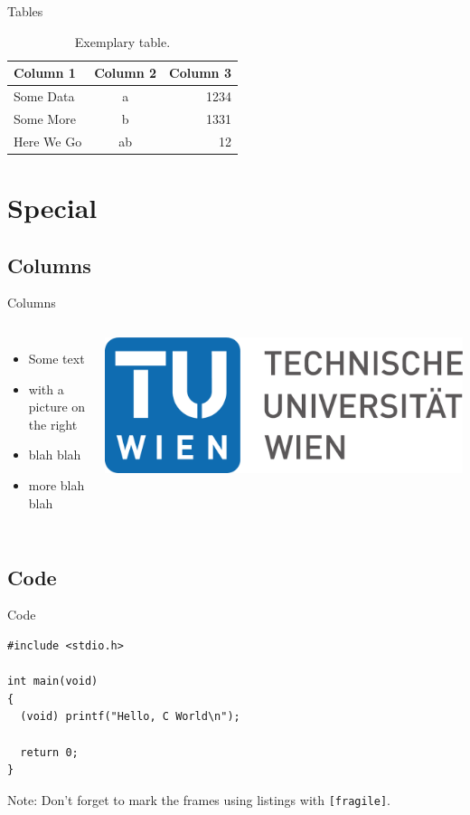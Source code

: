 \documentclass{beamer}
\begin{document}
\begin{frame}{Tables}{}
  \begin{table}
    \centering
    \begin{tabular}{lcr}
      \toprule
      Column 1 & Column 2 & Column 3 \\
      \midrule
      Some Data & a & 1234 \\
      Some More & b & 1331 \\
      Here We Go & ab & 12 \\
      \bottomrule
    \end{tabular}
    \caption{Exemplary table.}
    \label{tbl:example}
  \end{table}
\end{frame}

\section{Special}

\subsection{Columns}
\begin{frame}{Columns}
  \begin{columns}[c]
    \begin{itemize}
    \item Some text
    \item with a picture on the right
    \item blah blah
    \item more blah blah
    \end{itemize}
    \includegraphics[width=.8\textwidth]{TU_Logo}
  \end{columns}
\end{frame}

\subsection{Code}
\begin{frame}[fragile]{Code}
   \begin{lstlisting}[basicstyle=\ttfamily]
#include <stdio.h>

int main(void)
{
  (void) printf("Hello, C World\n");

  return 0;
}
   \end{lstlisting}

   Note: Don't forget to mark the frames using listings with
   \lstinline[columns=fixed]{[fragile]}.
\end{frame}
\end{document}
